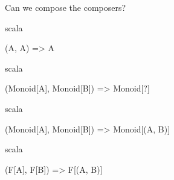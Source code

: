 \documentclass{beamer}
\begin{document}
\begin{frame}
  \centering
  \large

  Can we compose the composers?
\end{frame}

\begin{frame}[fragile]

  \centering
  \Large

  \begin{cminted}{scala}

(A, A) => A

  \end{cminted}

\end{frame}

\begin{frame}[fragile]

  \centering
  \large

  \begin{cminted}{scala}

(Monoid[A], Monoid[B]) => Monoid[?]

  \end{cminted}

\end{frame}

\begin{frame}[fragile]

  \centering
  \large

  \begin{cminted}{scala}

(Monoid[A], Monoid[B]) => Monoid[(A, B)]

  \end{cminted}

\end{frame}

%
%
%
%
%
%
%

\begin{frame}[fragile]

  \centering
  \large

  \begin{cminted}{scala}

(F[A], F[B]) => F[(A, B)]

  \end{cminted}

\end{frame}
\end{document}
